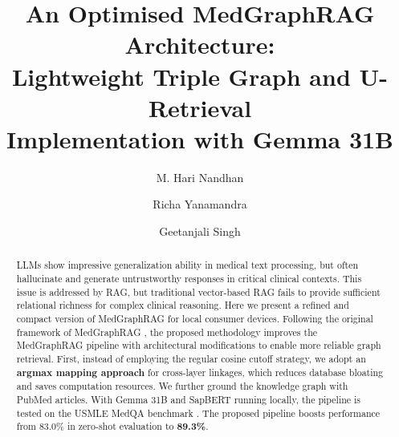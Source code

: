 \documentclass[a4paper,fleqn]{cas-sc}
\begin{document}
\setcounter{topnumber}{4}
\setcounter{bottomnumber}{4}
\setcounter{totalnumber}{8}
\renewcommand{\topfraction}{0.95}
\renewcommand{\bottomfraction}{0.95}
\renewcommand{\textfraction}{0.05}
\renewcommand{\floatpagefraction}{0.50}
\let\WriteBookmarks\relax
\def\floatpagepagefraction{1}
\def\textpagefraction{.001}


\title [mode = title]{An Optimised MedGraphRAG Architecture:\\
Lightweight Triple Graph and U-Retrieval\\
Implementation with Gemma 31B}

\author[1]{M. Hari Nandhan}

\author[1]{Richa Yanamandra}

\author[1]{Geetanjali Singh}

\cormark[1]



\begin{abstract}
LLMs show impressive generalization ability in medical text processing, but often hallucinate and generate untrustworthy responses in critical clinical contexts. This issue is addressed by RAG, but traditional vector-based RAG fails to provide sufficient relational richness for complex clinical reasoning. Here we present a refined and compact version of MedGraphRAG for local consumer devices. Following the original framework of MedGraphRAG \cite{wu2024medgraphrag}, the proposed methodology improves the MedGraphRAG pipeline with architectural modifications to enable more reliable graph retrieval. First, instead of employing the regular cosine cutoff strategy, we adopt an \textbf{argmax mapping approach} for cross-layer linkages, which reduces database bloating and saves computation resources. We further ground the knowledge graph with PubMed articles. With Gemma 31B \cite{gemma2024} and SapBERT \cite{liu2021sapbert} running locally, the pipeline is tested on the USMLE MedQA benchmark \cite{jin2021medqa}. The proposed pipeline boosts performance from 83.0\% in zero-shot evaluation to \textbf{89.3\%}.
\end{abstract}
\end{document}
